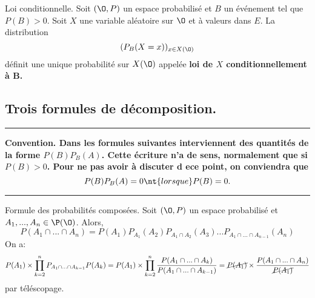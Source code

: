 \documentclass[11pt]{article}
\begin{document}
\begin{defi}{Loi conditionnelle.}{}
    Soit $(\O,P)$ un espace probabilisé et $B$ un événement tel que $P(B)>0$. Soit $X$ une variable aléatoire sur $\O$ et à valeurs dans $E$. La distribution
    \begin{equation*}
        (P_B(X=x))_{x\in X(\O)}
    \end{equation*}
    définit une unique probabilité sur $X(\O)$ appelée \bf{loi de $X$ conditionnellement à B}.
\end{defi}

\subsection{Trois formules de décomposition.}
\hrule\vspace{0.2cm}
\bf{Convention.} Dans les formules suivantes interviennent des quantités de la forme $P(B)P_B(A)$. Cette écriture n'a de sens, normalement que si $P(B)>0$. Pour ne pas avoir à discuter d ece point, on conviendra que
\begin{equation*}
    P(B)P_B(A)=0 \nt{ lorsque } P(B)=0.
\end{equation*}
\hrule\vspace{0.2cm}

\begin{prop}{Formule des probabilités composées.}{}
    Soit $(\O,P)$ un espace probabilisé et $A_1,...,A_n\in\P(\O)$. Alors,
    \begin{equation*}
        P(A_1\cap...\cap A_n)=P(A_1)P_{A_1}(A_2)P_{A_1\cap A_2}(A_3)...P_{A_1\cap...\cap A_{n-1}}(A_n)
    \end{equation*}
    \tcblower
    On a:
    \begin{equation*}
        P(A_1)\times\prod_{k=2}^nP_{A_1\cap...\cap A_{k-1}}P(A_k)=P(A_1)\times\prod_{k=2}^n\frac{P(A_1\cap...\cap A_k)}{P(A_1\cap...\cap A_{k-1})}=\cancel{P(A_1)}\times\frac{P(A_1\cap...\cap A_n)}{\cancel{P(A_1)}}
    \end{equation*}
    par téléscopage.
\end{prop}
\end{document}
